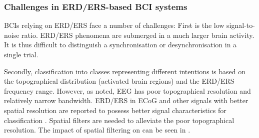 %

\subsubsection{Challenges in ERD/ERS-based BCI systems}

BCIs relying on ERD/ERS face a number of challenges: 
First is the low signal-to-noise ratio. ERD/ERS phenomena are submerged in a much larger brain activity.
It is thus difficult to distinguish a synchronisation or desynchronisation in a single trial. 

Secondly, classification into classes representing different intentions is based on the topographical distribution (activated brain regions) and the ERD/ERS frequency range. 
However, as noted, EEG has poor topographical resolution and relatively narrow bandwidth. 
ERD/ERS in ECoG and other signals with better spatial resolution are reported to possess better signal characteristics for classification \citep{wilson_ecog_2006, schalk_brain-computer_2011, power_automatic_2012, naseer_classification_2013, wang_electrocorticographic_2013}. 
Spatial filters are needed to alleviate the poor topographical resolution. 
The impact of spatial filtering on can be seen in \citep{hill_classifying_2006}.

